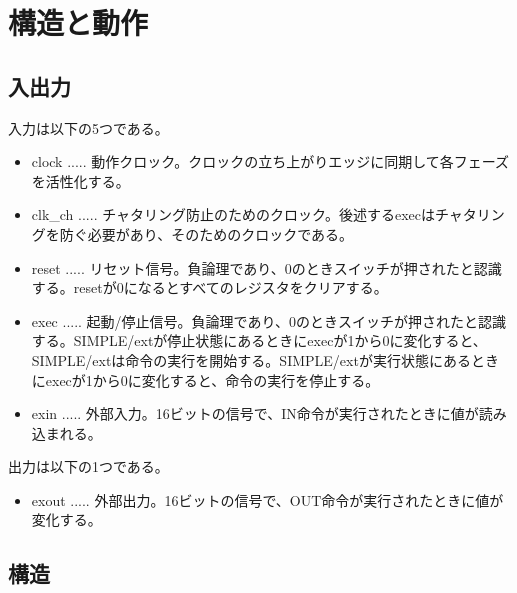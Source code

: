 \documentclass{jarticle}
\begin{document}
\section{構造と動作}
\subsection{入出力}
\hspace{10pt}入力は以下の5つである。
\begin{itemize}
\item clock ..... 動作クロック。クロックの立ち上がりエッジに同期して各フェーズを活性化する。
\item clk\_ch ..... チャタリング防止のためのクロック。後述するexecはチャタリングを防ぐ必要があり、そのためのクロックである。
\item reset ..... リセット信号。負論理であり、0のときスイッチが押されたと認識する。resetが0になるとすべてのレジスタをクリアする。
\item exec ..... 起動/停止信号。負論理であり、0のときスイッチが押されたと認識する。SIMPLE/extが停止状態にあるときにexecが1から0に変化すると、SIMPLE/extは命令の実行を開始する。SIMPLE/extが実行状態にあるときにexecが1から0に変化すると、命令の実行を停止する。
\item exin ..... 外部入力。16ビットの信号で、IN命令が実行されたときに値が読み込まれる。
\end{itemize}
出力は以下の1つである。
\begin{itemize}
\item exout ..... 外部出力。16ビットの信号で、OUT命令が実行されたときに値が変化する。
\end{itemize}

\subsection{構造}
\end{document}
